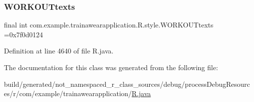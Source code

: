 \subsubsection{\texorpdfstring{WORKOUTtexts}{WORKOUTtexts}}
{\footnotesize\ttfamily final int com.\+example.\+trainawearapplication.\+R.\+style.\+W\+O\+R\+K\+O\+U\+Ttexts =0x7f0d0124\hspace{0.3cm}{\ttfamily [static]}}



Definition at line 4640 of file R.\+java.



The documentation for this class was generated from the following file\+:\begin{DoxyCompactItemize}
\item 
build/generated/not\+\_\+namespaced\+\_\+r\+\_\+class\+\_\+sources/debug/process\+Debug\+Resources/r/com/example/trainawearapplication/\mbox{\hyperlink{com_2example_2trainawearapplication_2_r_8java}{R.\+java}}\end{DoxyCompactItemize}
